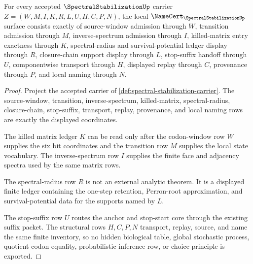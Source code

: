\begin{theorem}
\label{thm:spectral-stabilization-namecert-obligations}
For every accepted $\SpectralStabilizationUp$ carrier $Z=(W,M,I,K,R,L,U,H,C,P,N)$, the local $\NameCert_{\SpectralStabilizationUp}$ surface consists exactly of source-window admission through $W$, transition admission through $M$, inverse-spectrum admission through $I$, killed-matrix entry exactness through $K$, spectral-radius and survival-potential ledger display through $R$, closure-chain support display through $L$, stop-suffix handoff through $U$, componentwise transport through $H$, displayed replay through $C$, provenance through $P$, and local naming through $N$.
\end{theorem}
\begin{proof}
Project the accepted carrier of \autoref{def:spectral-stabilization-carrier}. The source-window, transition, inverse-spectrum, killed-matrix, spectral-radius, closure-chain, stop-suffix, transport, replay, provenance, and local naming rows are exactly the displayed coordinates.

The killed matrix ledger $K$ can be read only after the codon-window row $W$ supplies the six bit coordinates and the transition row $M$ supplies the local state vocabulary. The inverse-spectrum row $I$ supplies the finite face and adjacency spectra used by the same matrix rows.

The spectral-radius row $R$ is not an external analytic theorem. It is a displayed finite ledger containing the one-step retention, Perron-root approximation, and survival-potential data for the supports named by $L$.

The stop-suffix row $U$ routes the anchor and stop-start core through the existing suffix packet. The structural rows $H,C,P,N$ transport, replay, source, and name the same finite inventory, so no hidden biological table, global stochastic process, quotient codon equality, probabilistic inference row, or choice principle is exported.
\end{proof}

